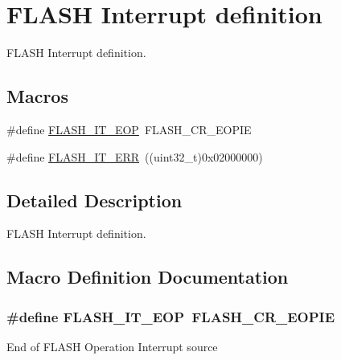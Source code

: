 \hypertarget{group___f_l_a_s_h___interrupt__definition}{}\section{F\+L\+A\+SH Interrupt definition}
\label{group___f_l_a_s_h___interrupt__definition}


F\+L\+A\+SH Interrupt definition.  


\subsection*{Macros}
\begin{DoxyCompactItemize}
\item 
\#define \hyperlink{group___f_l_a_s_h___interrupt__definition_gaea20e80e1806d58a7544cfe8659e7f11}{F\+L\+A\+S\+H\+\_\+\+I\+T\+\_\+\+E\+OP}~F\+L\+A\+S\+H\+\_\+\+C\+R\+\_\+\+E\+O\+P\+IE
\item 
\#define \hyperlink{group___f_l_a_s_h___interrupt__definition_ga4e2c23ab8c1b9a5ee49bf6d695d9ae8c}{F\+L\+A\+S\+H\+\_\+\+I\+T\+\_\+\+E\+RR}~((uint32\+\_\+t)0x02000000)
\end{DoxyCompactItemize}


\subsection{Detailed Description}
F\+L\+A\+SH Interrupt definition. 



\subsection{Macro Definition Documentation}
\subsubsection[{\texorpdfstring{F\+L\+A\+S\+H\+\_\+\+I\+T\+\_\+\+E\+OP}{FLASH_IT_EOP}}]{\setlength{\rightskip}{0pt plus 5cm}\#define F\+L\+A\+S\+H\+\_\+\+I\+T\+\_\+\+E\+OP~F\+L\+A\+S\+H\+\_\+\+C\+R\+\_\+\+E\+O\+P\+IE}\hypertarget{group___f_l_a_s_h___interrupt__definition_gaea20e80e1806d58a7544cfe8659e7f11}{}\label{group___f_l_a_s_h___interrupt__definition_gaea20e80e1806d58a7544cfe8659e7f11}
End of F\+L\+A\+SH Operation Interrupt source 
